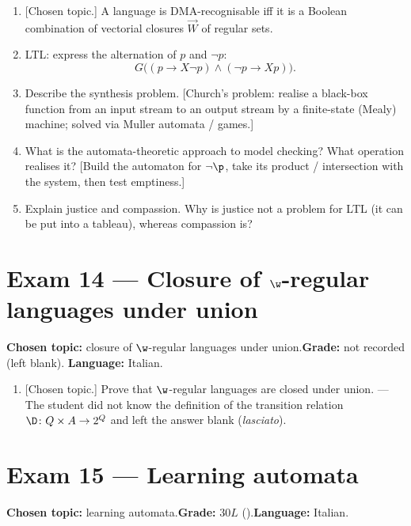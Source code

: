 \documentclass[oneside]{academica}
\begin{document}
\begin{enumerate}
  \item {}[Chosen topic.] A language is DMA-recognisable iff it is a
    Boolean combination of vectorial closures $\overrightarrow{W}$ of
    regular sets.
  \item LTL: express the alternation of $p$ and $\neg p$:
    \[
      G\big((p\rightarrow X\neg p)\wedge(\neg p\rightarrow X p)\big).
    \]
  \item Describe the synthesis problem. [Church's problem: realise a
    black-box function from an input stream to an output stream by a
    finite-state (Mealy) machine; solved via Muller automata / games.]
  \item What is the automata-theoretic approach to model checking? What
    operation realises it? [Build the automaton for $\neg\p$, take its
    product / intersection with the system, then test emptiness.]
  \item Explain justice and compassion. Why is justice not a problem for
    LTL (it can be put into a tableau), whereas compassion is?
\end{enumerate}

\section{Exam 14 --- Closure of \texorpdfstring{$\w$}{omega}-regular languages under union}
\textbf{Chosen topic:} closure of $\w$-regular languages under
union.\quad\textbf{Grade:} not recorded (left blank).\quad
\textbf{Language:} Italian.

\begin{enumerate}
  \item {}[Chosen topic.] Prove that $\w$-regular languages are closed
    under union. --- The student did not know the definition of the
    transition relation $\D\colon Q\times A\to 2^Q$ and left the answer
    blank (\textit{lasciato}).
\end{enumerate}

\section{Exam 15 --- Learning automata}
\textbf{Chosen topic:} learning automata.\quad\textbf{Grade:} $30L$
().\quad\textbf{Language:} Italian.
\end{document}
